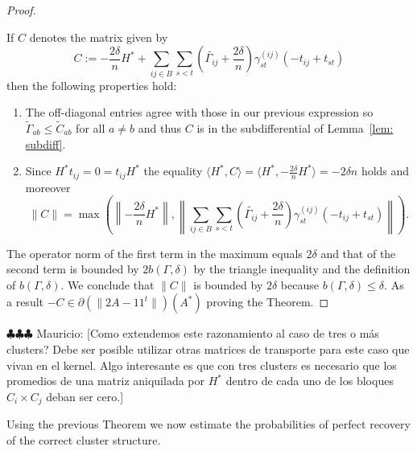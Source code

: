 \documentclass[12pt]{amsart}
\numberwithin{equation}{section}
\newcommand{\mv}[1]{{\color{red} \sf $\clubsuit\clubsuit\clubsuit$ Mauricio: [#1]}}
\begin{document}
\begin{proof}
\begin{enumerate}
\end{enumerate}
If $C$ denotes the matrix given by
\[C:= -\frac{2\delta}{n}H^* + \sum_{ij\in B} \sum_{s<t} \left(\widetilde{\Gamma_{ij}}+\frac{2\delta}{n}\right)\gamma_{st}^{(ij)} (-t_{ij}+t_{st})\]
then the following properties hold:
\begin{enumerate}
\item The off-diagonal entries agree with those in our previous expression so $\widetilde{\Gamma}_{ab}\leq \widetilde{C}_{ab}$ for all $a\neq b$ and thus $C$ is in the subdifferential of Lemma~\ref{lem: subdiff}.
\item Since $H^*t_{ij}=0=t_{ij}H^*$ the equality $\langle H^*, C\rangle =\langle H^*,-\frac{2\delta}{n}H^*\rangle = -2\delta n$ holds and moreover
\[ \| C\|=\max\left(\left\|-\frac{2\delta}{n}H^*\right\|, \left\|\sum_{ij\in B} \sum_{s<t} \left(\widetilde{\Gamma_{ij}}+\frac{2\delta}{n}\right)\gamma_{st}^{(ij)} (-t_{ij}+t_{st})\right\|\right).\] 
\end{enumerate}
The operator norm of the first term in the maximum equals $2\delta$ and that of the second term is bounded by $2b(\Gamma,\delta)$ by the triangle inequality and the definition of $b(\Gamma,\delta)$. We conclude that $\|C\|$ is bounded by $2\delta$ because $b(\Gamma,\delta)\leq \delta$. As a result $-C\in \partial\left(\|2A-11^t\|\right)(A^*)$ proving the Theorem.
\end{proof}

\mv{Como extendemos este razonamiento al caso de tres o m\'as clusters? Debe ser posible utilizar otras matrices de transporte para este caso que vivan en el kernel. Algo interesante es que con tres clusters es necesario que los promedios de una matriz aniquilada por $H^*$ dentro de cada uno de los bloques $C_i\times C_j$ deban ser cero.} 

Using the previous Theorem we now estimate the probabilities of perfect recovery of the correct cluster structure.
\end{document}
